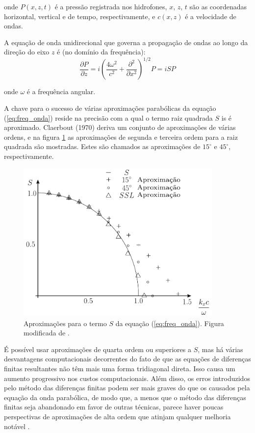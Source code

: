 onde $P(x, z, t)$ é a pressão registrada nos hidrofones, $x$, $z$, $t$ são as coordenadas horizontal, vertical e de tempo, respectivamente, e $c(x, z)$ é a velocidade de ondas.

A equação de onda unidirecional que governa a propagação de ondas ao longo da direção do eixo $z$ é (no domínio da frequência):
\begin{equation}
\frac{\partial P}{\partial z}=i\left(\frac{4\omega^{2}}{c^{2}}+\frac{\partial^{2}}{\partial x^{2}}\right)^{1/2} P=iSP
\label{eq:freq_onda}
\end{equation}

onde $\omega$ é a frequência angular.

A chave para o sucesso de várias aproximações parabólicas da equação (\ref{eq:freq_onda}) reside na precisão com a qual o termo raiz quadrada $S$ is é aproximado. Claerbout (1970) deriva um conjunto de aproximações de várias ordens, e na figura \ref{fig:df2} as aproximações de segunda e terceira ordem para a raiz quadrada são mostradas. Estes são chamados as aproximações de $15^{\circ}$ e $45^{\circ}$, respectivamente.

\begin{figure}[H]
\centering
\includegraphics[height=8.0cm]{figuras/cap3/df2.pdf}
\caption{Aproximações para o termo $S$ da equação (\ref{eq:freq_onda}). Figura modificada de \citep{HOOD(1978)}.}
\label{fig:df2}
\end{figure}

É possível usar aproximações de quarta ordem ou superiores a $S$, mas há várias desvantagens computacionais decorrentes do fato de que as equações de diferenças finitas resultantes não têm mais uma forma tridiagonal direta. Isso causa um aumento progressivo nos custos computacionais. Além disso, os erros introduzidos pelo método das diferenças finitas podem ser mais graves do que os causados pela equação da onda parabólica, de modo que, a menos que o método das diferenças finitas seja abandonado em favor de outras técnicas, parece haver poucas perspectivas de aproximações de alta ordem que atinjam qualquer melhoria notável \citep{HOOD(1978)}.


